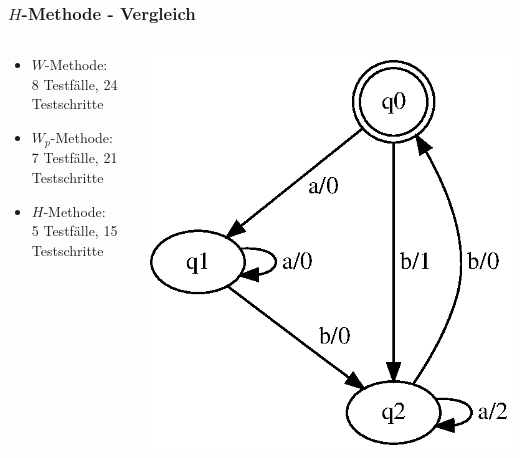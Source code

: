 \begin{frame}
\frametitle{$H$-Methode - Vergleich}
\begin{columns}[T] %

\begin{column}{.50\textwidth}
\begin{itemize}
    \item $W$-Methode:\\8 Testfälle, 24 Testschritte
    \item $W_p$-Methode:\\7 Testfälle, 21 Testschritte
    \item $H$-Methode:\\  5 Testfälle, 15 Testschritte
\end{itemize}
\end{column}%

\begin{column}{.50\textwidth}
\centering
\includegraphics[width=\textwidth]{images/fsm-example01_orig}%
\end{column}%

\end{columns}
\end{frame}

%

